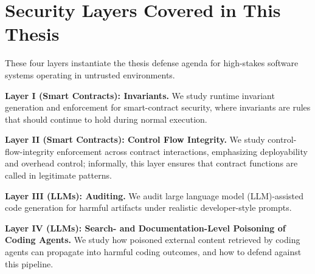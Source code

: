 \section{Security Layers Covered in This Thesis}

These four layers instantiate the thesis defense agenda for high-stakes software systems operating in untrusted environments.

\noindent \textbf{Layer I (Smart Contracts): Invariants.}
We study runtime invariant generation and enforcement for smart-contract security, where invariants are rules that should continue to hold during normal execution.

\noindent \textbf{Layer II (Smart Contracts): Control Flow Integrity.}
We study control-flow-integrity enforcement across contract interactions, emphasizing deployability and overhead control; informally, this layer ensures that contract functions are called in legitimate patterns.

\noindent \textbf{Layer III (LLMs): Auditing.}
We audit large language model (LLM)-assisted code generation for harmful artifacts under realistic developer-style prompts.

\noindent \textbf{Layer IV (LLMs): Search- and Documentation-Level Poisoning of Coding Agents.}
We study how poisoned external content retrieved by coding agents can propagate into harmful coding outcomes, and how to defend against this pipeline.
